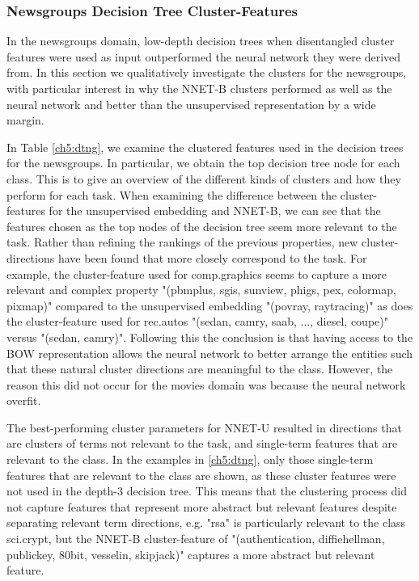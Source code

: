 \subsubsection{Newsgroups Decision Tree Cluster-Features}\label{ch5:newsgroupsquant}

In the newsgroups domain, low-depth decision trees when disentangled cluster features were used as input outperformed the neural network they were derived from. In this section we qualitatively investigate the clusters for the newsgroups, with particular interest in why the NNET-B clusters performed as well as the neural network and better than the unsupervised representation by a wide margin.

In Table \ref{ch5:dtng}, we examine the clustered features used in the decision trees for the newsgroups. In particular, 
we obtain the top decision tree node for each class. This is to give an overview of the different kinds of clusters and how they perform for each task. When examining the difference between the cluster-features for the unsupervised embedding and NNET-B, we can see that the features chosen as the top nodes of the decision tree seem more relevant to the task. Rather than refining the rankings of the previous properties, new cluster-directions have been found that more closely correspond to the task. For example, the cluster-feature used for comp.graphics seems to capture a more relevant and complex property  "(pbmplus, sgis, sunview, phigs, pex, colormap, pixmap)" compared to the unsupervised embedding "(povray, raytracing)" as does the cluster-feature used for rec.autos "(sedan, camry, saab, ..., diesel, coupe)" versus "(sedan, camry)". Following this the conclusion is that having access to the BOW representation allows the neural network to better arrange the entities such that these natural cluster directions are meaningful to the class. However, the reason this did not occur for the movies domain was because the neural network overfit. 

The best-performing cluster parameters for  NNET-U resulted in directions that are clusters of terms not relevant to the task, and single-term features that are relevant to the class. In the examples in \ref{ch5:dtng}, only those single-term features that are relevant to the class are shown, as these  cluster features were not used in the depth-3 decision tree. This means that the clustering process did not capture features that represent more abstract but relevant features despite separating relevant term directions, e.g.  "rsa" is particularly relevant to the class sci.crypt, but the NNET-B cluster-feature of  "(authentication, diffiehellman, publickey, 80bit, vesselin, skipjack)" captures a more abstract but relevant feature.  %




